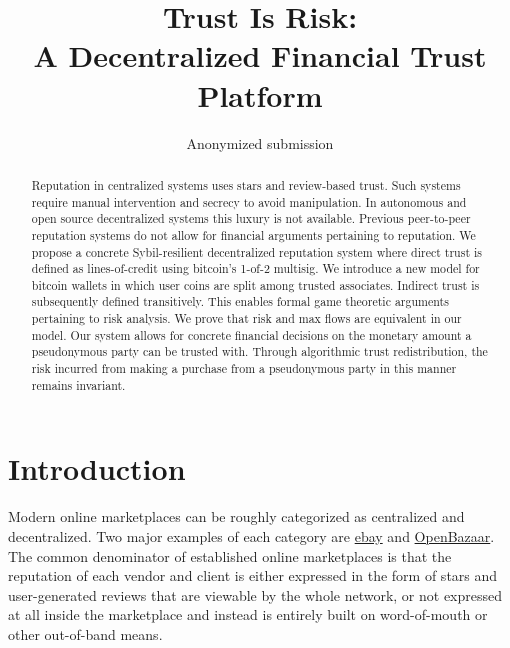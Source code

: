 \documentclass[11pt]{llncs}
\theoremstyle{definition}
\begin{document}
\title{Trust Is Risk: \\ A Decentralized Financial Trust Platform}
\author{Anonymized submission}
\institute{}
\maketitle
\thispagestyle{plain}
  \begin{abstract}
     Reputation in centralized systems uses stars and review-based trust. Such systems require manual intervention and
     secrecy to avoid manipulation. In autonomous and open source decentralized systems this luxury is not available.
     Previous peer-to-peer reputation systems do not allow for financial arguments pertaining to reputation. We propose a
     concrete Sybil-resilient decentralized reputation system where direct trust is defined as lines-of-credit using
     bitcoin's 1-of-2 multisig. We introduce a new model for bitcoin wallets in which user coins are split among trusted
     associates. Indirect trust is subsequently defined transitively. This enables formal game theoretic arguments pertaining
     to risk analysis. We prove that risk and max flows are equivalent in our model. Our system allows for concrete financial
     decisions on the monetary amount a pseudonymous party can be trusted with. Through algorithmic trust redistribution, the
     risk incurred from making a purchase from a pseudonymous party in this manner remains invariant.
  \end{abstract}

  \section{Introduction}
     Modern online marketplaces can be roughly categorized as centralized and decentralized.
     Two major examples of each category are \href{http://www.ebay.com}{ebay} and \href{https://openbazaar.org/}{OpenBazaar}.
     The common denominator of established online marketplaces is that the reputation of each vendor and client is either
     expressed in the form of stars and user-generated reviews that are viewable by the whole network, or not expressed at
     all inside the marketplace and instead is entirely built on word-of-mouth or other out-of-band means.
\end{document}

